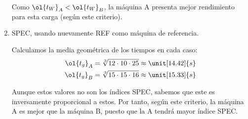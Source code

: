 \begin{ejercicio}
\begin{enumerate}
    Como $\ol{t_W}_A < \ol{t_W}_B$, la máquina A presenta mejor rendimiento para esta carga (según este criterio).
    \item SPEC, usando nuevamente REF como máquina de referencia.
    
    Calculamos la media geométrica de los tiempos en cada caso:
    \begin{align*}
        \ol{t_g}_A = \sqrt[3]{12 \cdot 10 \cdot 25} &\approx \unit[14.42]{s}\\
        \ol{t_g}_B = \sqrt[3]{15 \cdot 15 \cdot 16} &\approx \unit[15.33]{s}
    \end{align*}

    Aunque estos valores no son los índices SPEC, sabemos que este es inversamente proporcional a estos. Por tanto, según este criterio, la máquina A es mejor que la máquina B, puesto que la A tendrá mayor índice SPEC.
\end{enumerate}
\end{ejercicio}
\begin{comment}Sol:
a) A: 15,67s, B: 15,33s. Es más rápida la B (media aritmética menor). b) Los pesos serían: $w_1=w_2=0,4$, $w_3 = 0,2$. Las medias ponderadas según esos pesos serían: A: 13,8s, B: 15,2s. En ese caso, es la más rápida la A (media aritmética ponderada menor). c) SPEC_A = 1,75. SPEC_B = 1,64. En ese último caso, sería mejor la máquina A (SPEC mayor). También podíamos haber calculado directamente la media geométrica de los tiempos de ejecución (14,42s para A, 15,33s para la B, confirmando que la máquina A sería la máquina elegida usando el criterio SPEC por tener menor media geométrica de los tiempos de ejecución).
\end{comment}

